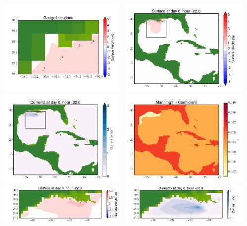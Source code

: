\documentclass[11pt]{article}
\begin{document}
\includegraphics[width=0.475\textwidth]{frame0049fig10.png}
\vskip 10pt 
\includegraphics[width=0.475\textwidth]{frame0050fig1.png}
\includegraphics[width=0.475\textwidth]{frame0050fig2.png}
\vskip 10pt 
\includegraphics[width=0.475\textwidth]{frame0050fig3.png}
\includegraphics[width=0.475\textwidth]{frame0050fig4.png}
\vskip 10pt 
\includegraphics[width=0.475\textwidth]{frame0050fig5.png}
\end{document}
